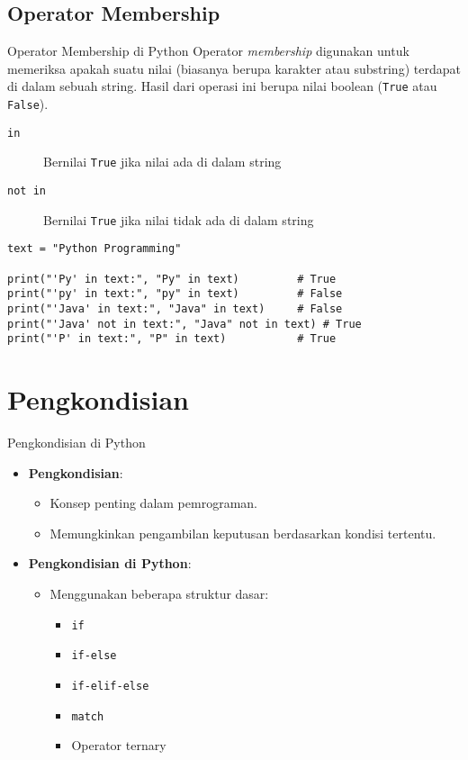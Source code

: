 \documentclass[aspectratio=169, table]{beamer}
\begin{document}
\subsection{Operator Membership}

\begin{frame}[fragile]{Operator Membership di Python}
Operator \textit{membership} digunakan untuk memeriksa apakah suatu nilai (biasanya berupa karakter atau substring) 
terdapat di dalam sebuah string. Hasil dari operasi ini berupa nilai boolean (\texttt{True} atau \texttt{False}).
\begin{description}
    \item[\texttt{in}] Bernilai \texttt{True} jika nilai ada di dalam string
    \item[\texttt{not in}] Bernilai \texttt{True} jika nilai tidak ada di dalam string
\end{description}

\begin{lstlisting}[style=PythonStyle, caption={Kode Python: membership_operator.py}]
text = "Python Programming"

print("'Py' in text:", "Py" in text)         # True
print("'py' in text:", "py" in text)         # False
print("'Java' in text:", "Java" in text)     # False
print("'Java' not in text:", "Java" not in text) # True
print("'P' in text:", "P" in text)           # True
\end{lstlisting}
\end{frame}

\section{Pengkondisian}

\begin{frame}[fragile]{Pengkondisian di Python}
\begin{itemize}
\item \textbf{Pengkondisian}:
\begin{itemize}
\item Konsep penting dalam pemrograman.
\item Memungkinkan pengambilan keputusan berdasarkan kondisi tertentu.
\end{itemize}

\item \textbf{Pengkondisian di Python}:
\begin{itemize}
\item Menggunakan beberapa struktur dasar:
\begin{itemize}
	\item \texttt{if}
	\item \texttt{if-else}
	\item \texttt{if-elif-else}
	\item \texttt{match}
	\item Operator ternary
\end{itemize}
\end{itemize}
\end{itemize}
\end{frame}
\end{document}

